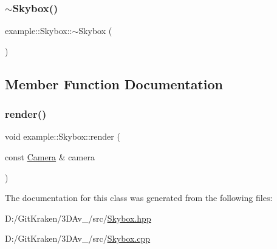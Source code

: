 \mbox{\label{classexample_1_1_skybox_abeed66eef405ebc5d29a4bdd949210d8}} 
\subsubsection{\texorpdfstring{$\sim$\+Skybox()}{~Skybox()}}
{\footnotesize\ttfamily example\+::\+Skybox\+::$\sim$\+Skybox (\begin{DoxyParamCaption}{ }\end{DoxyParamCaption})}



\subsection{Member Function Documentation}
\mbox{\label{classexample_1_1_skybox_a0f6edb0a0b5b81cb31c55b9207a82ad6}} 
\subsubsection{\texorpdfstring{render()}{render()}}
{\footnotesize\ttfamily void example\+::\+Skybox\+::render (\begin{DoxyParamCaption}\item[{const \mbox{\hyperlink{classexample_1_1_camera}{Camera}} \&}]{camera }\end{DoxyParamCaption})}



The documentation for this class was generated from the following files\+:\begin{DoxyCompactItemize}
\item 
D\+:/\+Git\+Kraken/3\+D\+Av\+\_/src/\mbox{\hyperlink{_skybox_8hpp}{Skybox.\+hpp}}\item 
D\+:/\+Git\+Kraken/3\+D\+Av\+\_/src/\mbox{\hyperlink{_skybox_8cpp}{Skybox.\+cpp}}\end{DoxyCompactItemize}
